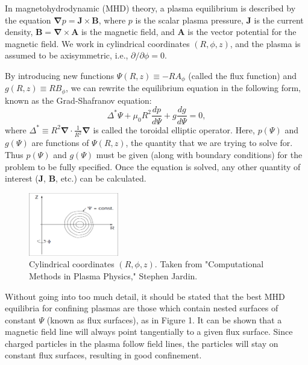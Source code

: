 \documentclass[paper=letter, fontsize=11pt]{scrartcl} %
\begin{document}
In magnetohydrodynamic (MHD) theory, a plasma equilibrium is described by the equation $\mathbf{\nabla} p = \mathbf{J} \times \mathbf{B}$, where $p$ is the scalar plasma pressure, $\mathbf{J}$ is the current density, $\mathbf{B} = \mathbf{\nabla} \times \mathbf{A}$ is the magnetic field, and $\mathbf{A}$ is the vector potential for the magnetic field.  We work in cylindrical coordinates $(R, \phi, z)$, and the plasma is assumed to be axisymmetric, i.e., $\partial / \partial \phi = 0$.

By introducing new functions $\Psi(R,z) \equiv -R A_{\phi}$ (called the flux function) and $g(R,z) \equiv R B_{\phi}$, we can rewrite the equilibrium equation in the following form, known as the Grad-Shafranov equation:
\begin{equation}
\Delta^{*} \Psi + \mu_0 R^2 \frac{dp}{d\Psi} + g \frac{dg}{d\Psi} = 0,
\end{equation}
where $\Delta^{*} \equiv R^2 \mathbf{\nabla} \cdot \frac{1}{R^2} \mathbf{\nabla}$ is called the toroidal elliptic operator. Here, $p(\Psi)$ and $g(\Psi)$ are functions of $\Psi(R,z)$, the quantity that we are trying to solve for.  Thus $p(\Psi)$ and $g(\Psi)$ must be given (along with boundary conditions) for the problem to be fully specified.  Once the equation is solved, any other quantity of interest ($\mathbf{J}$, $\mathbf{B}$, etc.) can be calculated.  

\begin{figure}
\centering
\captionsetup{justification=centering,margin=3cm}
\caption[caption]{Cylindrical coordinates $(R,\phi,z)$.  Taken from "Computational Methods in Plasma Physics," Stephen Jardin.}

\includegraphics[width=0.35\textwidth]{coordinates}

\end{figure}

Without going into too much detail, it should be stated that the best MHD equilibria for confining plasmas are those which contain nested surfaces of constant $\Psi$ (known as flux surfaces), as in Figure 1.  It can be shown that a magnetic field line will always point tangentially to a given flux surface.  Since charged particles in the plasma follow field lines, the particles will stay on constant flux surfaces, resulting in good confinement. 
\end{document}
